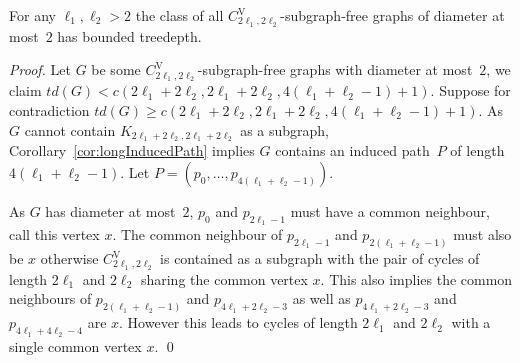 \documentclass[runningheads,envcountsame]{llncs}
\newcommand{\sharedVertex}[1]{C^{\mathrm{V}}_{#1}}
\begin{document}
\begin{theorem}
\label{thm:diam2-CV24}
    For any $\ell_1,\ell_2>2$ the class of all $\sharedVertex{2\ell_1,2\ell_2}$-subgraph-free graphs of diameter at most~$2$ has bounded treedepth.
\end{theorem}
\begin{proof}
    Let $G$ be some $\sharedVertex{2\ell_1,2\ell_2}$-subgraph-free graphs with diameter at most~$2$, we claim $td(G) < c(2\ell_1+2\ell_2, 2\ell_1+2\ell_2, 4(\ell_1+\ell_2-1)+1)$. Suppose for contradiction $td(G) \geq c(2\ell_1+2\ell_2, 2\ell_1+2\ell_2, 4(\ell_1+\ell_2-1)+1)$. As $G$ cannot contain  $K_{2\ell_1+2\ell_2, 2\ell_1+2\ell_2}$ as a subgraph, Corollary~\ref{cor:longInducedPath} implies $G$ contains an induced path~$P$ of length $4(\ell_1+\ell_2-1)$. Let $P= (p_0, \ldots, p_{4(\ell_1+\ell_2-1)})$.

    As $G$ has diameter at most~$2$, $p_0$ and $p_{2\ell_1-1}$ must have a common neighbour, call this vertex $x$. The common neighbour of $p_{2\ell_1-1}$ and  $p_{2(\ell_1+\ell_2-1)}$ must also be $x$ otherwise $\sharedVertex{2\ell_1,2\ell_2}$ is contained as a subgraph with the pair of cycles of length $2\ell_1$ and $2\ell_2$ sharing the common vertex $x$. This also implies the common neighbours of $p_{2(\ell_1+\ell_2-1)}$ and $p_{4\ell_1+2\ell_2-3}$ as well as  $p_{4\ell_1+2\ell_2-3}$ and $p_{4\ell_1+4\ell_2-4}$ are $x$. However this leads to cycles of length $2\ell_1$ and $2\ell_2$ with a single common vertex $x$. \qed
  \end{proof}
\end{document}
